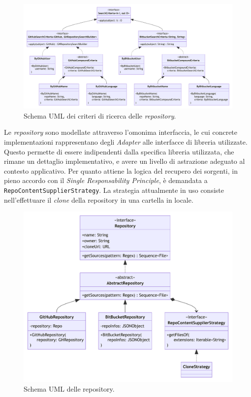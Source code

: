 \begin{figure}
    \centering
    \includegraphics[width=\textwidth]{resources/img/02-search-criteria.pdf}
    \caption{Schema UML dei criteri di ricerca delle \textit{repository}.}
    \label{img:02-search-criteria}
\end{figure}

Le \textit{repository} sono modellate attraverso l'omonima interfaccia, le cui concrete implementazioni rappresentano degli \textit{Adapter} \cite{gof} alle interfacce di libreria utilizzate.
%
Questo permette di essere indipendenti dalla specifica libreria utilizzata, che rimane un dettaglio implementativo, e avere un livello di astrazione adeguato al contesto applicativo.
%
Per quanto attiene la logica del recupero dei sorgenti, in pieno accordo con il \textit{Single Responsability Principle}, è demandata a \texttt{RepoContentSupplierStrategy}.
%
La strategia attualmente in uso consiste nell'effettuare il \textit{clone} della repository in una cartella in locale.

\begin{figure}[h!]
    \centering
    \includegraphics[width=\textwidth]{resources/img/02-repos.pdf}
    \caption{Schema UML delle repository.}
    \label{img:02-repos}
\end{figure}

